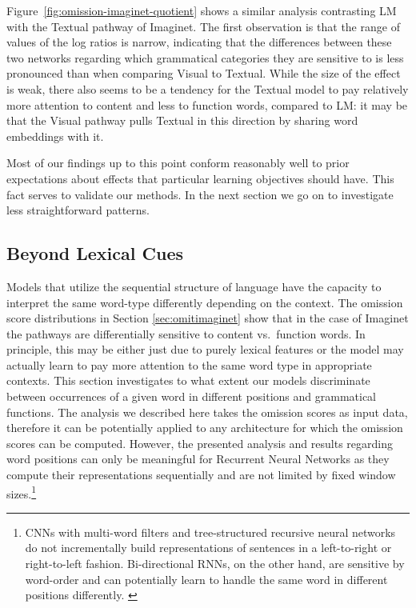 Figure~\ref{fig:omission-imaginet-quotient} shows a similar analysis
contrasting {\sc LM} with the {\sc Textual} pathway of {\sc
  Imaginet}. The first observation is that the range of values of the
log ratios is narrow, indicating that the differences between these
two networks regarding which grammatical categories they are sensitive
to is less pronounced than when comparing {\sc Visual} to {\sc
  Textual}. While the size of the effect is weak, there also seems to
be a tendency for the {\sc Textual} model to pay relatively more
attention to content and less to function words, compared to
{\sc LM}: it may be that the {\sc Visual} pathway pulls {\sc Textual}
in this direction by sharing word embeddings with it.


Most of our findings up to this point conform reasonably well to prior
expectations about effects that  particular learning objectives should
have. This fact serves to validate our methods. In the next section we
go on to investigate less straightforward patterns.



\subsection{Beyond Lexical Cues}
\label{sec:beyondlexical}

Models that utilize the sequential structure of language 
have the capacity to interpret the same word-type differently depending on
the context. The omission score distributions in Section \ref{sec:omitimaginet} 
show that in the case of {\sc Imaginet} the 
pathways are differentially sensitive to content vs.\ function
words. In principle, this may be either just due to purely lexical features or the model 
may actually learn to pay more attention to the same word type in appropriate
contexts. This section investigates to what extent our models
discriminate between occurrences of a given word in different positions and 
grammatical functions. The analysis we described here takes \label{edit:beyonlexicalgeneral}
the omission scores as input data, therefore it can be potentially applied 
to any architecture for which the omission scores can be computed. However,
the presented analysis and results regarding word positions can only be meaningful
for Recurrent Neural Networks as they compute their representations sequentially and are not
limited by fixed window sizes.\footnote{CNNs with multi-word filters
and tree-structured recursive neural networks do not incrementally build representations
of sentences in a left-to-right or right-to-left fashion. 
Bi-directional RNNs, on the other hand, are sensitive by word-order and can potentially
learn to handle the same word in different positions differently. \label{edit:foot}}

